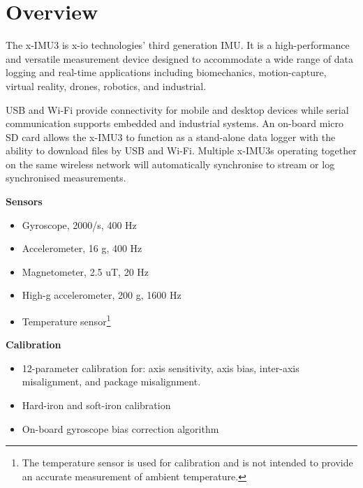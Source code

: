 \section{Overview}

\begin{multicols}{2}

The x-IMU3 is x-io technologies' third generation \ac{IMU}.  It is a high-performance and versatile measurement device designed to accommodate a wide range of data logging and real-time applications including biomechanics, motion-capture, virtual reality, drones, robotics, and industrial.

\acs{USB} and Wi-Fi provide connectivity for mobile and desktop devices while serial communication supports embedded and industrial systems.  An on-board micro \acs{SD} card allows the x-IMU3 to function as a stand-alone data logger with the ability to download files by USB and Wi-Fi.  Multiple x-IMU3s operating together on the same wireless network will automatically synchronise to stream or log synchronised measurements.

\textbf{Sensors}
\begin{itemize}[nolistsep]
    \item Gyroscope, \textpm{}2000\textdegree{}/s, 400 Hz
    \item Accelerometer, \textpm{}16 g, 400 Hz
    \item Magnetometer, \textpm{}2.5 uT, 20 Hz
    \item High-g accelerometer, \textpm{}200 g, 1600 Hz
    \item Temperature sensor\footnote{The temperature sensor is used for calibration and is not intended to provide an accurate measurement of ambient temperature.}
\end{itemize}

\textbf{Calibration}
\begin{itemize}[nolistsep]
    \item 12-parameter calibration for: axis sensitivity, axis bias, inter-axis misalignment, and package misalignment.
    \item Hard-iron and soft-iron calibration
    \item On-board gyroscope bias correction algorithm
\end{itemize}


\end{multicols}
